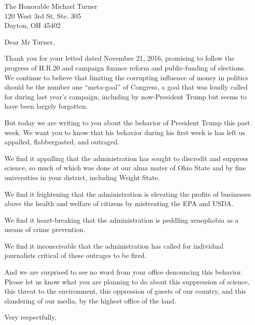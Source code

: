 \documentclass{letter}
\begin{document}
\begin{letter}{
  The Honorable Michael Turner \\
  120 West 3rd St, Ste. 305 \\
  Dayton, OH 45402}

\opening{Dear Mr Turner,}

Thank you for your letted dated November 21, 2016, promising to follow the progress of H.R.20 and campaign finance reform and public-funding of elections. We continue to believe that limiting the corrupting influence of money in politics should be the number one ``meta-goal'' of Congress, a goal that was loudly called for during last year's campaign, including by now-President Trump but seems to have been largely forgotten.

But today we are writing to you about the behavior of President Trump this past week. We want you to know that his behavior during his first week is has left us appalled, flabbergasted, and outraged.

We find it appalling that the administration has sought to discredit and suppress science, so much of which was done at our alma mater of Ohio State and by fine universities in your district, including Wright State.

We find it frightening that the administration is elevating the profits of businesses above the health and welfare of citizens by mistreating the EPA and USDA.

We find it heart-breaking that the administration is peddling xenophobia as a means of crime prevention.

We find it inconceivable that the administration has called for individual journalists critical of these outrages to be fired.

And we are surprised to see no word from your office denouncing this behavior. Please let us know what you are planning to do about this suppression of science, this threat to the environment, this oppression of guests of our country, and this slandering of our media, by the highest office of the land.



\closing{Very respectfully,}


\end{letter}
\end{document}
